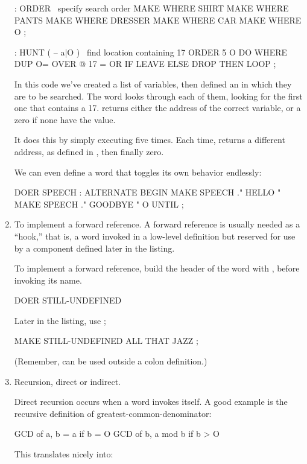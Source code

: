 \begin{enumerate}
\begin{Code}
: ORDER  \  specify search order
   MAKE WHERE  SHIRT   MAKE WHERE  PANTS
   MAKE WHERE  DRESSER   MAKE WHERE CAR
   MAKE WHERE  O ;

: HUNT  ( -- a|O )  \  find location containing 17
   ORDER  5 O DO  WHERE  DUP O=  OVER @  17 =  OR  IF
      LEAVE  ELSE  DROP  THEN  LOOP ;
\end{Code}
In this code we've created a list of variables, then defined an  in
which they are to be searched. The word  looks through each of them,
looking for the first one that contains a 17.  returns either the
address of the correct variable, or a zero if none have the value.

It does this by simply executing  five times. Each time, 
returns a different address, as defined in , then finally zero.

We can even define a  word that toggles its own behavior endlessly:

\begin{Code}
DOER SPEECH
: ALTERNATE
   BEGIN  MAKE SPEECH ." HELLO "
   MAKE SPEECH ." GOODBYE "
   O UNTIL ;
\end{Code}
\item To implement a forward reference. A forward reference is usually needed as
a ``hook,'' that is, a word invoked in a low-level definition but reserved for
use by a component defined later in the listing.

To implement a forward reference, build the header of the word with ,
before invoking its name.

\begin{Code}
DOER STILL-UNDEFINED
\end{Code}
Later in the listing, use ;

\begin{Code}
MAKE STILL-UNDEFINED  ALL THAT JAZZ ;
\end{Code}
(Remember,  can be used outside a colon definition.)

\item Recursion, direct or indirect.

Direct recursion occurs when a word invokes itself. A good example is the
recursive definition of greatest-common-denominator:

\begin{Code}
GCD of a, b =  a                     if b = O
               GCD of b, a mod b     if b > O
\end{Code}
This translates nicely into:


\end{enumerate}
